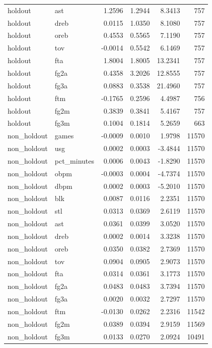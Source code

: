 \begin{table}
\begin{tabular}{llrrrr}
holdout & ast & 1.2596 & 1.2944 & 8.3413 & 757 \\
holdout & dreb & 0.0115 & 1.0350 & 8.1080 & 757 \\
holdout & oreb & 0.4553 & 0.5565 & 7.1190 & 757 \\
holdout & tov & -0.0014 & 0.5542 & 6.1469 & 757 \\
holdout & fta & 1.8004 & 1.8005 & 13.2341 & 757 \\
holdout & fg2a & 0.4358 & 3.2026 & 12.8555 & 757 \\
holdout & fg3a & 0.0883 & 0.3538 & 21.4960 & 757 \\
holdout & ftm & -0.1765 & 0.2596 & 4.4987 & 756 \\
holdout & fg2m & 0.3839 & 0.3841 & 5.4167 & 757 \\
holdout & fg3m & 0.1004 & 0.1814 & 5.2659 & 663 \\
non\_holdout & games & -0.0009 & 0.0010 & 1.9798 & 11570 \\
non\_holdout & usg & 0.0002 & 0.0003 & -3.4844 & 11570 \\
non\_holdout & pct\_minutes & 0.0006 & 0.0043 & -1.8290 & 11570 \\
non\_holdout & obpm & -0.0003 & 0.0004 & -4.7374 & 11570 \\
non\_holdout & dbpm & 0.0002 & 0.0003 & -5.2010 & 11570 \\
non\_holdout & blk & 0.0087 & 0.0116 & 2.2351 & 11570 \\
non\_holdout & stl & 0.0313 & 0.0369 & 2.6119 & 11570 \\
non\_holdout & ast & 0.0361 & 0.0399 & 3.0520 & 11570 \\
non\_holdout & dreb & 0.0002 & 0.0014 & 3.3238 & 11570 \\
non\_holdout & oreb & 0.0350 & 0.0382 & 2.7369 & 11570 \\
non\_holdout & tov & 0.0904 & 0.0905 & 2.9073 & 11570 \\
non\_holdout & fta & 0.0314 & 0.0361 & 3.1773 & 11570 \\
non\_holdout & fg2a & 0.0483 & 0.0483 & 3.7394 & 11570 \\
non\_holdout & fg3a & 0.0020 & 0.0032 & 2.7297 & 11570 \\
non\_holdout & ftm & -0.0130 & 0.0262 & 2.2316 & 11542 \\
non\_holdout & fg2m & 0.0389 & 0.0394 & 2.9159 & 11569 \\
non\_holdout & fg3m & 0.0133 & 0.0270 & 2.0924 & 10491 \\
\bottomrule
\end{tabular}
\end{table}
